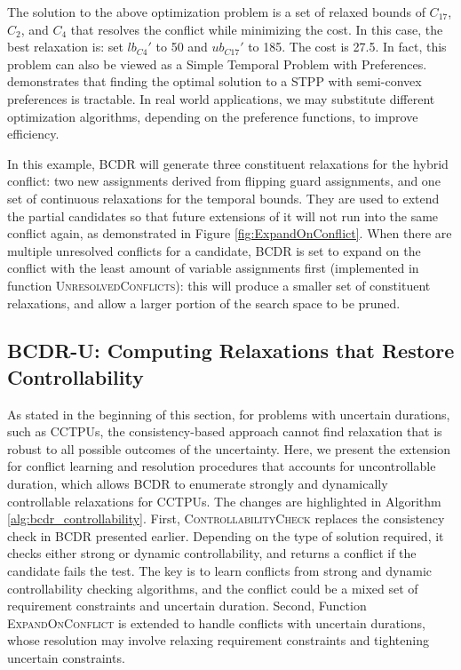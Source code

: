 \documentclass[jair,twoside,11pt,theapa]{article}
\begin{document}
The solution to the above optimization problem is a set of relaxed bounds of
$C_{17}$, $C_2$, and $C_4$ that resolves the conflict while minimizing the cost.
In this case, the best relaxation is: set $lb_{C4}'$ to 50 and $ub_{C17}'$ to
185. The cost is 27.5. In fact, this problem can also be viewed as a Simple
Temporal Problem with Preferences. 
demonstrates that finding the optimal solution to a STPP with semi-convex
preferences is tractable. In real world applications, we may substitute
different optimization algorithms, depending on the preference functions, to
improve efficiency.


In this example, BCDR will generate three constituent relaxations for the hybrid
conflict: two new assignments derived from flipping guard assignments, and one
set of continuous relaxations for the temporal bounds. They are used to extend
the partial candidates so that future extensions of it will not run into the same
conflict again, as demonstrated in Figure \ref{fig:ExpandOnConflict}. When there are multiple unresolved conflicts for a candidate, BCDR is set to expand on the conflict with the least amount of variable assignments first (implemented in function \textsc{UnresolvedConflicts}): this will produce a smaller set of constituent relaxations, and allow a larger portion of the search space to be pruned.


\subsection{BCDR-U: Computing Relaxations that Restore Controllability}


As stated in the beginning of this section, for problems with uncertain
durations, such as CCTPUs, the consistency-based approach cannot find relaxation
that is robust to all possible outcomes of the uncertainty. Here, we
present the extension for conflict learning and resolution procedures that
accounts for uncontrollable duration, which allows BCDR to enumerate strongly
and dynamically controllable relaxations for CCTPUs. The changes are highlighted
in Algorithm \ref{alg:bcdr_controllability}. First, \textsc{ControllabilityCheck} replaces the consistency check in BCDR
presented earlier. Depending on the type of solution required, it checks either
strong or dynamic controllability, and returns a conflict if the candidate
fails the test. The key is to learn conflicts from strong and dynamic
controllability checking algorithms, and the conflict could be a mixed set of
requirement constraints and uncertain duration. Second, Function
\textsc{ExpandOnConflict} is extended to handle conflicts with uncertain
durations, whose resolution may involve relaxing requirement constraints and
tightening uncertain constraints.
\end{document}
